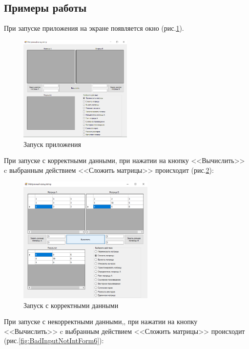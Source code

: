 \subsection{Примеры работы}

При запуске приложения на экране появляется окно (рис.\ref{fig:StartForm6}).

\newpage

\begin{figure}[!h]
    \centering
    \includegraphics[width = 0.5\textwidth]{images/Task6/Start.png}
    \caption{Запуск приложения}
    \label{fig:StartForm6}
\end{figure}

При запуске с корректными данными, при нажатии на кнопку <<Вычислить>> c выбранным действием <<Сложить матрицы>> происходит (рис.\ref{fig:WorkForm6}):

\begin{figure}[!h]
    \centering
    \includegraphics[width = 0.6\textwidth]{images/Task6/WorkSum.png}
    \caption{Запуск с корректными данными}
    \label{fig:WorkForm6}
\end{figure}

При запуске с некорректными данными,, при нажатии на кнопку <<Вычислить>> c выбранным действием <<Сложить матрицы>> происходит (рис.\ref{fig:BadInputNotIntForm6}):

